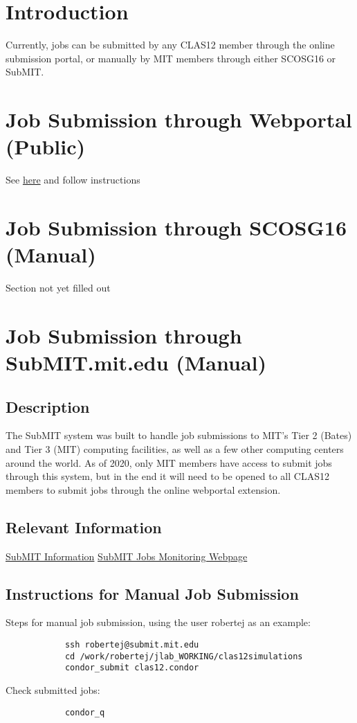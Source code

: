 \section{Introduction}
Currently, jobs can be submitted by any CLAS12 member through the online submission portal, or manually by MIT members through either SCOSG16 or SubMIT.
\section{Job Submission through Webportal (Public)}
See \href{https://gemc.jlab.org/web_interface/index.php}{here} and follow instructions
\section{Job Submission through SCOSG16 (Manual)}
Section not yet filled out
\section{Job Submission through SubMIT.mit.edu (Manual)}
\subsection{Description}
The SubMIT system was built to handle job submissions to MIT's Tier 2 (Bates) and Tier 3 (MIT) computing facilities, as well as a few other computing centers around the world. As of 2020, only MIT members have access to submit jobs through this system, but in the end it will need to be opened to all CLAS12 members to submit jobs through the online webportal extension. 
\subsection{Relevant Information}
\href{http://submit.mit.edu/}{SubMIT Information}
\href{http://submit.mit.edu/condormon/index.php}{SubMIT Jobs Monitoring Webpage}
\subsection{Instructions for Manual Job Submission}
Steps for manual job submission, using the user robertej as an example:

        \begin{lstlisting}
            ssh robertej@submit.mit.edu
            cd /work/robertej/jlab_WORKING/clas12simulations
            condor_submit clas12.condor
        \end{lstlisting}
        
        
        Check submitted jobs:
        
        \begin{lstlisting}
            condor_q
        \end{lstlisting}
        
